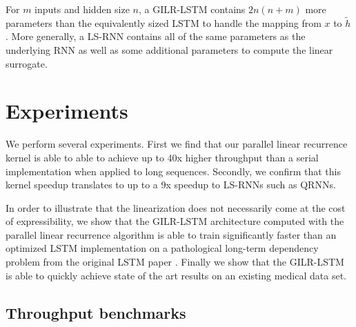 \documentclass{article}
\begin{document}
For $m$ inputs and hidden size $n$, a GILR-LSTM contains $2n(n+m)$ more
parameters than the equivalently sized LSTM to handle the mapping from $x$ to
$\tilde{h}$. More generally, a LS-RNN contains all of the same parameters as the
underlying RNN as well as some additional parameters to compute the linear
surrogate.

\section{Experiments}
We perform several experiments. First we find that our parallel linear recurrence
kernel is able to able to achieve up to 40x higher throughput than a serial implementation
when applied to long sequences. Secondly, we confirm that this kernel speedup
translates to up to a 9x speedup to LS-RNNs such as QRNNs.

In order to illustrate that the linearization does not necessarily come at the
cost of expressibility, we show that the GILR-LSTM architecture computed with
the parallel linear recurrence algorithm is able to train significantly faster
than an optimized LSTM implementation on a pathological long-term dependency
problem from the original LSTM paper \citep{hochreiter1997long}.
Finally we show that the GILR-LSTM is able to
quickly achieve state of the art results on an existing medical data
set. 

\subsection{Throughput benchmarks}
\end{document}
